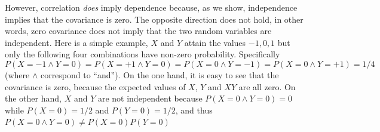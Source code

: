 However, correlation {\em does} imply dependence because, as we show,
independence implies that the covariance is zero. The opposite
direction does not hold, in other words, zero covariance does not
imply that the two random variables are independent. Here is a simple
example, $X$ and $Y$ attain the values $-1,0,1$ but only the following
four combinations have non-zero probability. Specifically
\[
P(X=-1 \wedge Y=0)=
P(X=+1 \wedge Y=0)=
P(X=0 \wedge Y=-1)=
P(X=0 \wedge Y=+1)=1/4
\]
(where $\wedge$ correspond to ``and''). On the one hand, it is easy to
see that the covariance is zero, because the expected values of $X$,
$Y$ and $XY$ are all zero. On the other hand, $X$ and $Y$ are not
independent because $P(X=0 \wedge Y=0)=0$ while $P(X=0)=1/2$ and
$P(Y=0)=1/2$, and thus $P(X=0 \wedge Y=0) \neq P(X=0)P(Y=0)$

